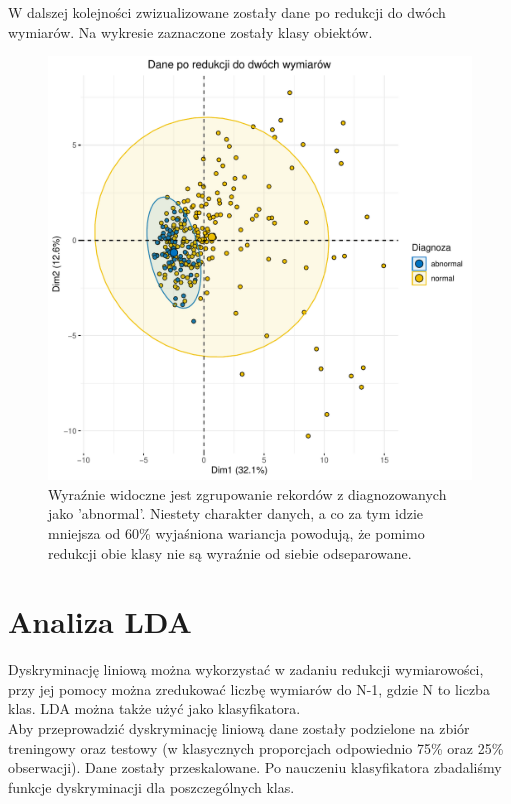 \documentclass[10pt,a4paper]{article}
\begin{document}
W dalszej kolejności zwizualizowane zostały dane po redukcji do dwóch wymiarów. Na wykresie zaznaczone zostały klasy obiektów.

\begin{figure}[H]
\includegraphics[scale=0.5]{klasy.pdf}
\caption{Wyraźnie widoczne jest zgrupowanie rekordów z diagnozowanych jako 'abnormal'. Niestety charakter danych, a co za tym idzie mniejsza od 60\% wyjaśniona wariancja powodują, że pomimo redukcji obie klasy nie są wyraźnie od siebie odseparowane.}
\end{figure}

\newpage
\section{Analiza LDA}
Dyskryminację liniową można wykorzystać w zadaniu redukcji wymiarowości, przy jej pomocy można zredukować liczbę wymiarów do N-1, gdzie N to liczba klas. LDA można także użyć jako klasyfikatora.
\\Aby przeprowadzić dyskryminację liniową dane zostały podzielone na zbiór treningowy oraz testowy (w klasycznych proporcjach odpowiednio 75\% oraz 25\% obserwacji). Dane zostały przeskalowane. Po nauczeniu klasyfikatora zbadaliśmy funkcje dyskryminacji dla poszczególnych klas.
\end{document}
